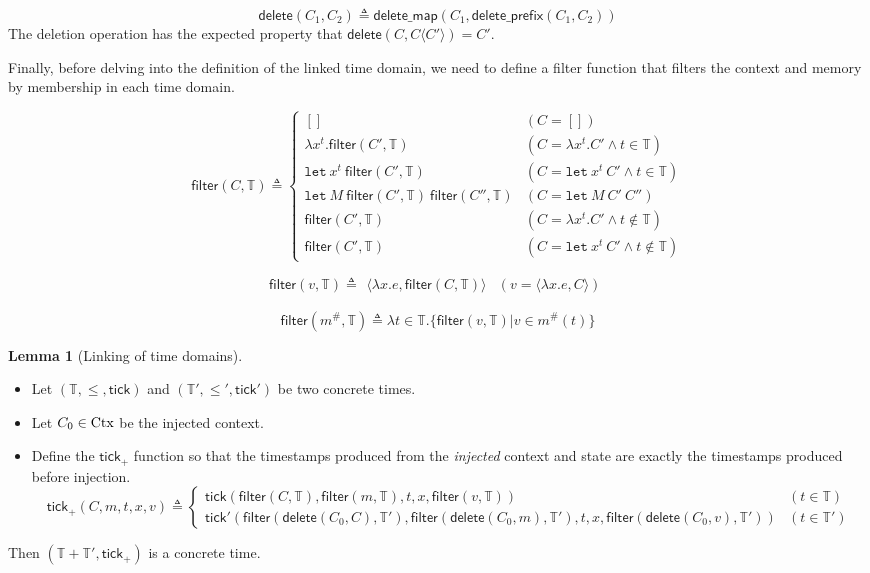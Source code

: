 \documentclass{article}
\theoremstyle{definition}
\newtheorem{lem}{Lemma}[section]
\newcommand*{\A}[1]{{#1}^{\#}}
\newcommand*{\Time}{\mathbb{T}}
\newcommand*{\Ctx}[1]{\text{Ctx}\vphantom{#1}}
\newcommand*{\mem}{m}
\newcommand*{\tick}{\mathsf{tick}}
\newcommand*{\inject}[2]{{#1}\langle{#2}\rangle}
\newcommand*{\deletepre}{\mathsf{delete\_prefix}}
\newcommand*{\deletemap}{\mathsf{delete\_map}}
\newcommand*{\delete}{\mathsf{delete}}
\newcommand*{\filter}{\mathsf{filter}}
\newcommand*{\Let}{\mathtt{let}}
\begin{document}
\[
  \delete(C_{1},C_{2})\triangleq \deletemap(C_{1},\deletepre(C_{1},C_{2}))
\]
The deletion operation has the expected property that $\delete(C,\inject{C}{C'})=C'$.

Finally, before delving into the definition of the linked time domain, we need to define a filter function that filters the context and memory by membership in each time domain.

\[
  \filter(C,\Time)\triangleq
  \begin{cases}
    []                                             & (C=[])                                   \\
    \lambda x^{t}.\filter(C',\Time)                & (C=\lambda x^{t}.C'\wedge t\in\Time)     \\
    \Let\:x^{t}\:\filter(C',\Time)                 & (C=\Let\:x^{t}\:C'\wedge t\in\Time)      \\
    \Let\:M\:\filter(C',\Time)\:\filter(C'',\Time) & (C=\Let\:M\:C'\:C'')                     \\
    \filter(C',\Time)                              & (C=\lambda x^{t}.C'\wedge t\not\in\Time) \\
    \filter(C',\Time)                              & (C=\Let\:x^{t}\:C'\wedge t\not\in\Time)
  \end{cases}
\]

\[
  \filter(v,\Time)\triangleq
  \begin{array}{ll}
    \langle\lambda x.e,\filter(C,\Time)\rangle & (v=\langle\lambda x.e,C\rangle)
  \end{array}
\]

\[
  \filter(\A\mem,\Time)\triangleq
  \lambda t\in\Time.\{\filter(v,\Time)|v\in\A{m}(t)\}
\]

\begin{lem}[Linking of time domains]
  $\:$

  \begin{itemize}
    \item Let $(\Time,\le,\tick)$ and $(\Time',\le',\tick')$ be two concrete times.
    \item Let $C_{0}\in\Ctx{\Time}$ be the injected context.
    \item Define the $\tick_{+}$ function so that the timestamps produced from the \emph{injected} context and state are exactly the timestamps produced before injection.
          \[
            \tick_{+}(C,\mem,t,x,v)\triangleq
            \begin{cases}
              \tick(\filter(C,\Time),\filter(\mem,\Time),t,x,\filter(v,\Time))                                            & (t\in\Time)  \\
              \tick'(\filter(\delete(C_0,C),\Time'),\filter(\delete(C_0,\mem),\Time'),t,x,\filter(\delete(C_0,v),\Time')) & (t\in\Time')
            \end{cases}
          \]
  \end{itemize}

  Then $(\Time+\Time',\tick_{+})$ is a concrete time.
\end{lem}
\end{document}

